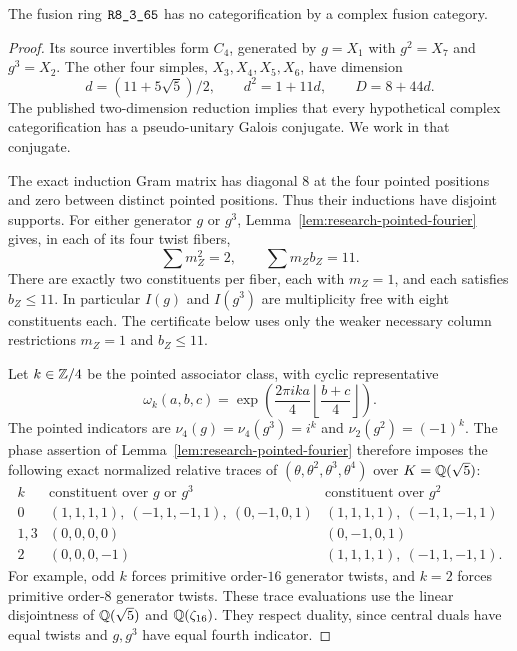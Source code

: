\begin{theorem}
\label{thm:research-r65-excluded}
The fusion ring $\sha{R8_3_65}$ has no categorification by a complex
fusion category.
\end{theorem}
\begin{proof}
Its source invertibles form $C_4$, generated by $g=X_1$ with
$g^2=X_7$ and $g^3=X_2$.  The other four simples, $X_3,X_4,X_5,X_6$,
have dimension
\[
 d=(11+5\sqrt5)/2,\qquad d^2=1+11d,\qquad D=8+44d.
\]
The published two-dimension reduction
\cite[Lemma~3.1]{SchNear} implies that every hypothetical complex
categorification has a pseudo-unitary Galois conjugate.  We work in
that conjugate.

The exact induction Gram matrix has diagonal $8$ at the four
pointed positions and zero between distinct pointed positions.
Thus their inductions have disjoint supports.  For either generator
$g$ or $g^3$, Lemma~\ref{lem:research-pointed-fourier} gives, in
each of its four twist fibers,
\[
 \sum m_Z^2=2,\qquad \sum m_Zb_Z=11.
\]
There are exactly two constituents per fiber, each with $m_Z=1$,
and each satisfies $b_Z\leq11$.  In particular $I(g)$ and $I(g^3)$
are multiplicity free with eight constituents each.  The certificate
below uses only the weaker necessary column restrictions $m_Z=1$
and $b_Z\leq11$.

Let $k\in\mathbb Z/4$ be the pointed associator class, with cyclic
representative
\[
 \omega_k(a,b,c)=\exp\left(\frac{2\pi i k a}{4}
                 \left\lfloor\frac{b+c}{4}\right\rfloor\right).
\]
The pointed indicators are
$\nu_4(g)=\nu_4(g^3)=i^k$ and $\nu_2(g^2)=(-1)^k$.
The phase assertion of Lemma~\ref{lem:research-pointed-fourier}
therefore imposes the following exact normalized relative traces
of $(\theta,\theta^2,\theta^3,\theta^4)$ over $K=\mathbb Q(\sqrt5)$:
\[
\begin{array}{c|l|l}
k&\text{constituent over }g\text{ or }g^3
 &\text{constituent over }g^2\\\hline
0&(1,1,1,1),\ (-1,1,-1,1),\ (0,-1,0,1)
 &(1,1,1,1),\ (-1,1,-1,1)\\
1,3&(0,0,0,0)&(0,-1,0,1)\\
2&(0,0,0,-1)&(1,1,1,1),\ (-1,1,-1,1).
\end{array}
\]
For example, odd $k$ forces primitive order-$16$ generator twists,
and $k=2$ forces primitive order-$8$ generator twists.
These trace evaluations use the linear disjointness of
$\mathbb Q(\sqrt5)$ and $\mathbb Q(\zeta_{16})$.  They respect duality, since
central duals have equal twists and $g,g^3$ have equal fourth
indicator.


\end{proof}
